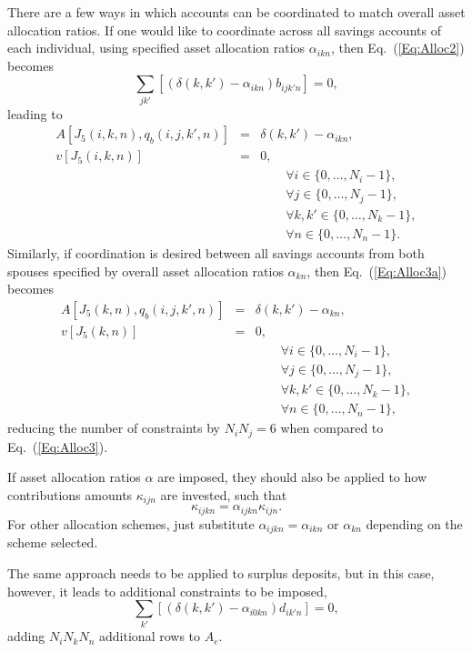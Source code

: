 \documentclass{article}[fleqn,12pt]
\begin{document}
There are a few ways in which accounts can be coordinated to match
overall asset allocation ratios.
If one would like to coordinate across all savings accounts of each individual,
using specified asset allocation ratios $\alpha_{ikn}$,
then Eq.~(\ref{Eq:Alloc2}) becomes
\begin{equation}
	\label{Eq:Alloc2a}
	\sum_{jk'} [(\delta(k, k') - \alpha_{ikn}) b_{ijk'n}] = 0,
\end{equation}
leading to
\begin{eqnarray}
	\label{Eq:Alloc3a}
	A[J_5(i, k, n), q_b(i, j, k', n)] &=& \delta(k, k') - \alpha_{ikn}, \nonumber\\
	v[J_5(i, k, n)] &=& 0, \\
	&&\qquad\forall i \in \{0,\ldots, N_i-1\},\nonumber\\
	&&\qquad\forall j \in \{0,\ldots, N_j-1\},\nonumber\\
	&&\qquad\forall k,k' \in \{0,\ldots, N_k-1\},\nonumber\\
	&&\qquad\forall n \in \{0,\ldots, N_n-1\}. \nonumber
\end{eqnarray}
Similarly, if coordination is desired between all savings accounts from both spouses
specified by overall asset allocation ratios $\alpha_{kn}$,
then Eq.~(\ref{Eq:Alloc3a}) becomes
\begin{eqnarray}
	\label{Eq:Alloc3b}
	A[J_5(k, n), q_b(i, j, k', n)] &=& \delta(k, k') - \alpha_{kn}, \nonumber\\
	v[J_5(k, n)] &=& 0, \\
	&&\qquad\forall i \in \{0,\ldots, N_i-1\},\nonumber\\
	&&\qquad\forall j \in \{0,\ldots, N_j-1\},\nonumber\\
	&&\qquad\forall k,k' \in \{0,\ldots, N_k-1\},\nonumber\\
	&&\qquad\forall n \in \{0,\ldots, N_n-1\}, \nonumber
\end{eqnarray}
reducing the number of constraints by $N_iN_j=6$ when compared to Eq.~(\ref{Eq:Alloc3}).

If asset allocation ratios $\alpha$ are imposed,
they should also be applied to how
contributions amounts $\kappa_{ijn}$ are invested, such that 
\begin{equation}
	\kappa_{ijkn} = \alpha_{ijkn} \kappa_{ijn}.
\end{equation}
For other allocation schemes, just substitute $\alpha_{ijkn} = \alpha_{ikn}$ or $\alpha_{kn}$
depending on the scheme selected.

The same approach needs to be applied to surplus deposits, but
in this case, however, it leads to
additional constraints to be imposed,
\begin{equation}
	\sum_{k'} [(\delta(k, k') - \alpha_{i0kn}) d_{ik'n}] = 0,
\end{equation}
adding $N_iN_kN_n$ additional rows to $A_e$.
\end{document}
